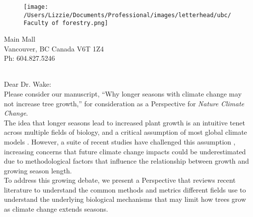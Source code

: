 \documentclass[11pt,a4paper]{article}
\begin{document}

\begin{figure}[htbp]
\hspace*{14cm}                                                           
\hspace{-35ex} \texttt{[image: /Users/Lizzie/Documents/Professional/images/letterhead/ubc/Faculty of forestry.png]}
\end{figure}
\vspace{-10ex}
\begin{small}
 Main Mall \\
\noindent Vancouver, BC Canada V6T 1Z4\\
\noindent Ph: 604.827.5246\\
\end{small}
\vspace{2ex}\\
\noindent Dear Dr. Wake: %
\vspace{1.5ex}\\
Please consider our manuscript, ``Why longer seasons with climate change may not increase tree growth,'' for consideration as a Perspective for \emph{Nature Climate Change}. 
\vspace{1.5ex}\\
The idea that longer seasons lead to increased plant growth is an intuitive tenet across multiple fields of biology, and a critical assumption of most global climate models \citep{friedlingstein2022global}. However, a suite of recent studies have challenged this assumption \citep[e.g.][]{dow2022warm,green2022limits}, increasing concerns that future climate change impacts could be underestimated due to methodological factors %
that influence the relationship between growth and growing season length\citep{green2022limits,korner2023four}.
\vspace{1.5ex}\\
To address this growing debate, we present a Perspective that reviews recent literature to understand the common methods and metrics different fields use to understand the underlying biological mechanisms that may limit how trees grow as climate change extends seasons. 
\end{document}
